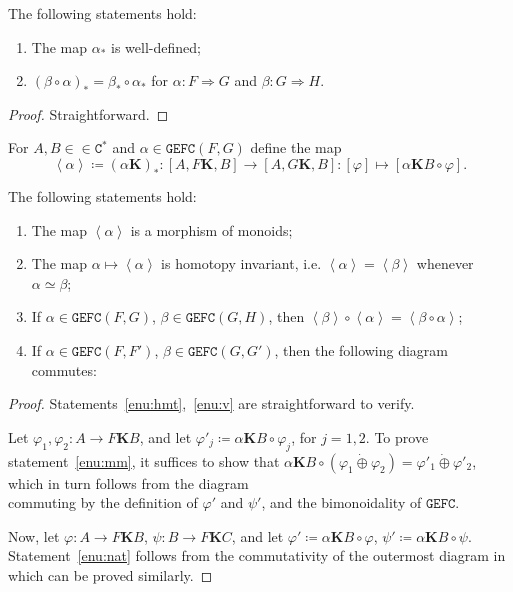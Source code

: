 \documentclass[10pt]{simplearticle}
\newcommand{\tikzinput}[1]{}
\newcommand{\GEFC}{\mathbb{\mathtt{GEFC}}}
\newcommand{\Cstar}{\mathtt{C^{*}}}
\newcommand{\uu}{\dot{\oplus}}
\newcommand{\fK}{\mathbf{K}}
\begin{document}
\begin{lem}\label{lem:weak-rangle}
The following statements hold:
\begin{enumerate}
\item The map $\alpha_{*}$ is well-defined;
\item $(\beta\circ\alpha)_{*}=\beta_{*}\circ\alpha{}_{*}$ for $\alpha\colon F\Rightarrow G$
and $\beta\colon G\Rightarrow H$.
\end{enumerate}
\end{lem}

\begin{proof}
Straightforward.
\end{proof}

\begin{defn}
For $A,B\in\in\Cstar$ and $\alpha\in\GEFC(F,G)$ define the map
\[
\left\langle \alpha\right\rangle \coloneqq(\alpha\fK)_{*}\colon[A,F\fK,B]\to[A,G\fK,B]\colon[\varphi]\mapsto[\alpha\fK B\circ\varphi].
\]
\end{defn}

\begin{thm}\label{thm:58}
The following statements hold:%
\begin{enumerate}[label=\textup{(\roman*)}]

\item\label{enu:mm}The map $\left\langle \alpha\right\rangle $ is a morphism
of monoids;
\item\label{enu:hmt}The map $\alpha\mapsto\left\langle \alpha\right\rangle $
is homotopy invariant, i.e. $\left\langle \alpha\right\rangle =\left\langle \beta\right\rangle $
whenever $\alpha\simeq\beta$;
\item\label{enu:v}If $\alpha\in\GEFC(F,G)$, $\beta\in\GEFC(G,H)$, then
$\left\langle \beta\right\rangle \circ\left\langle \alpha\right\rangle =\left\langle \beta\circ\alpha\right\rangle $;
\item\label{enu:nat}If $\alpha\in\GEFC(F,F')$, $\beta\in\GEFC(G,G')$,
then the following diagram commutes:
\[
\tikzinput{d287}
\]
\end{enumerate}
\end{thm}

\begin{proof}
Statements~\ref{enu:hmt},~\ref{enu:v} are straightforward to verify.

Let $\varphi_{1},\varphi_{2}\colon A\to F\fK B$, and let $\varphi'_{j}\coloneqq\alpha\fK B\circ\varphi_{j}$,
for $j=1,2$. To prove statement~\ref{enu:mm},
it suffices to show that $\alpha\fK B\circ(\varphi_{1}\uu\varphi_{2})=\varphi'_{1}\uu\varphi'_{2}$,
which in turn follows from the diagram
\[
\tikzinput{d281}
\]
commuting by the definition of $\varphi'$ and $\psi'$, and the bimonoidality
of $\GEFC$.

Now, let $\varphi\colon A\to F\fK B$, $\psi\colon B\to F\fK C$,
and let $\varphi'\coloneqq\alpha\fK B\circ\varphi$, $\psi'\coloneqq\alpha\fK B\circ\psi$.
Statement~\ref{enu:nat} follows from the commutativity of the outermost
diagram in
\[
\tikzinput{d302}
\]
which can be proved similarly.
\end{proof}
\end{document}
